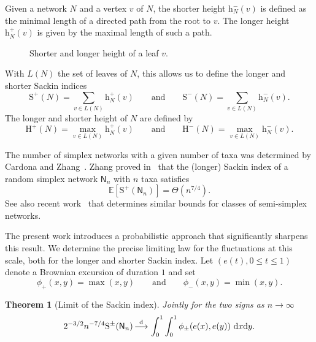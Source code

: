 \documentclass[english,11pt]{smfart}
\newcommand{\minmaxnet}[2]{%
  \coordinate (o)  at (1.6, 0);   \coordinate (v1) at (1.6,-0.9);
  \coordinate (vL) at (0.6,-1.7);  \coordinate (vR) at (2.6,-1.7);
  \coordinate (l1) at (-0.1,-2.6); \coordinate (w)  at (2.6,-2.6);
  \coordinate (l4) at (3.4,-2.6);  \coordinate (r)  at (1.6,-2.6);
  \coordinate (l3) at (1.6,-3.6);  \coordinate (l2) at (2.6,-3.6);
  \draw[#1] (o)--(v1)--(vL)--(r)--(l3);
  \draw[#2] (o)--(v1)--(vR)--(w)--(r)--(l3);
  \draw[eD] (o)--(v1);  \draw[eD] (v1)--(vL); \draw[eD] (v1)--(vR);
  \draw[eD] (vL)--(l1); \draw[eD] (vR)--(w);  \draw[eD] (vR)--(l4);
  \draw[eD] (w)--(l2);
  \draw[retD] (vL)--(r); \draw[retD] (w)--(r); \draw[retD] (r)--(l3);
  \node[tvD] at (o) {}; \node[tvD] at (v1) {}; \node[tvD] at (vL) {};
  \node[tvD] at (vR) {}; \node[tvD] at (w) {};
  \node[lfD] at (l1) {1}; \node[lfD] at (l2) {2}; \node[lfD] at (l4) {3};
  \node[lfD] at (l3) {$v$}; \node[rtD] at (r) {};
}
\newcommand{\Ex}[1]{\mathbb{E}[#1]}
\newcommand{\convdis}{\,{\buildrel \mathrm{d} \over \longrightarrow}\,}
\newcommand{\He}{\mathrm{H}}
\newcommand{\he}{\mathrm{h}}
\newcommand{\Si}{\mathrm{S}}
\newcommand{\mN}{\mathsf{N}}
\newtheorem{theorem}{Theorem}[section]
\numberwithin{equation}{section}
\begin{document}
Given a network $N$ and a vertex $v$ of $N$, the shorter height $\he^-_N(v)$ is defined as the minimal length of a directed path from the root to $v$. The longer height $\he^+_N(v)$ is given by the maximal length of such a path. 

\begin{figure}[H]\centering
{}\qquad\qquad
{}
\caption{Shorter and longer height of a leaf $v$.}
\label{fig:shortlongheight}
\end{figure}



With $L(N)$ the set of leaves of $N$, this allows us to define the longer and shorter Sackin indices
\[
	\Si^+(N) = \sum_{v \in L(N)} \he^+_N(v) \qquad \text{and} \qquad 	\Si^-(N) = \sum_{v \in L(N)} \he^-_N(v).
\]
The longer and shorter height of $N$ are defined by
\[
	\He^+(N) = \max_{v \in L(N)} \he^+_N(v) \qquad \text{and} \qquad 	\He^-(N) = \max_{v \in L(N)} \he^-_N(v).
\]

The number of simplex networks with a given number of taxa was determined by Cardona and Zhang~\cite{zbMATH07244280}.
Zhang proved in~\cite{zbMATH07570970} that the (longer) Sackin index of a random simplex network $\mN_n$ with $n$ taxa satisfies
\[
	\Ex{\Si^+(\mN_n)} = \Theta(n^{7/4}).
\]
See also recent work~\cite{tap} that determines similar bounds for classes of semi-simplex networks.

The present work introduces a probabilistic approach that significantly sharpens this result. We determine the precise limiting law for the fluctuations at this scale, both for the longer and shorter Sackin index. Let $(e(t), 0 \le t \le 1)$ denote a Brownian excursion of duration $1$ and set
\[
	\phi_+(x,y) = \max(x, y) \qquad \text{and} \qquad \phi_-(x,y) = \min(x, y).
\]
\begin{theorem}[Limit of the Sackin index]
	\label{te:main}
	Jointly for the two signs as $n \to \infty$
	\[
		2^{-3/2} n ^{-7/4} \Si^\pm(\mN_n) \convdis \int_{0}^1\int_{0}^1 \phi_{\pm}(e(x),e(y)) \,\,\mathrm{d}x \mathrm{d}y.
	\]
\end{theorem}
\end{document}

